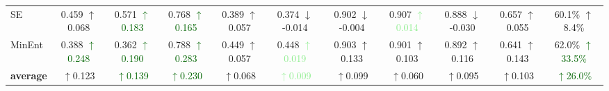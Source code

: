 \begin{table}[ht]
{\begin{tabular}{lcccccccccc}
			SE          & 0.459 \textcolor{medGreen}{$\uparrow$0.068} & 0.571 \textcolor{darkGreen}{$\uparrow$0.183} & 0.768 \textcolor{darkGreen}{$\uparrow$0.165} & 0.389 \textcolor{medGreen}{$\uparrow$0.057} & 0.374 \textcolor{lightRed}{$\downarrow$-0.014} & 0.902 \textcolor{lightRed}{$\downarrow$-0.004} & 0.907 \textcolor{lightGreen}{$\uparrow$0.014} & 0.888 \textcolor{lightRed}{$\downarrow$-0.030} & 0.657 \textcolor{medGreen}{$\uparrow$0.055} & 60.1\% \enspace \textcolor{medGreen}{$\uparrow$8.4\%} \\
			MinEnt      & 0.388 \textcolor{darkGreen}{$\uparrow$0.248} & 0.362 \textcolor{darkGreen}{$\uparrow$0.190} & 0.788 \textcolor{darkGreen}{$\uparrow$0.283} & 0.449 \textcolor{medGreen}{$\uparrow$0.057} & 0.448 \textcolor{lightGreen}{$\uparrow$0.019} & 0.903 \textcolor{medGreen}{$\uparrow$0.133} & 0.901 \textcolor{medGreen}{$\uparrow$0.103} & 0.892 \textcolor{medGreen}{$\uparrow$0.116} & 0.641 \textcolor{medGreen}{$\uparrow$0.143} & 62.0\% \textcolor{darkGreen}{$\uparrow$33.5\%} \\
			
			
			
			
			
			
			\midrule
			\textbf{average} &\textcolor{medGreen}{$\uparrow$0.123} & \textcolor{darkGreen}{$\uparrow$0.139} & \textcolor{darkGreen}{$\uparrow$0.230} & \textcolor{medGreen}{$\uparrow$0.068} & \textcolor{lightGreen}{$\uparrow$0.009} & \textcolor{medGreen}{$\uparrow$0.099} & \textcolor{medGreen}{$\uparrow$0.060} & \textcolor{medGreen}{$\uparrow$0.095} & \textcolor{medGreen}{$\uparrow$0.103} & \textcolor{darkGreen}{$\uparrow$26.0\%} \\  %
			
			\bottomrule
	\end{tabular}}
	\label{tab:ablation_aug}
\end{table}




	
